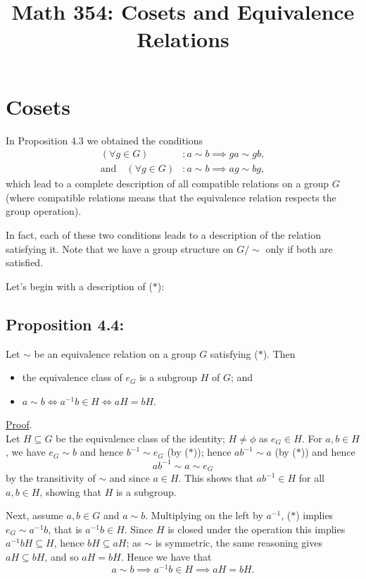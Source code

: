

\title{Math 354: Cosets and Equivalence Relations}

\section*{Cosets}

In Proposition 4.3 we obtained the conditions
\begin{align*}
(\forall g \in G) &: a \sim b \implies ga \sim gb, \tag{$*$} \\
\text{and} \quad (\forall g \in G) &: a \sim b \implies ag \sim bg,
\end{align*}
which lead to a complete description of all compatible relations on a group $G$ (where compatible relations means that the equivalence relation respects the group operation).

In fact, each of these two conditions leads to a description of the relation satisfying it. Note that we have a group structure on $G/{\sim}$ only if both are satisfied.

Let's begin with a description of ($*$):

\subsection*{Proposition 4.4:}
Let $\sim$ be an equivalence relation on a group $G$ satisfying ($*$). Then
\begin{itemize}
    \item the equivalence class of $e_G$ is a subgroup $H$ of $G$; and
    \item $a \sim b \iff a^{-1}b \in H \iff aH = bH$.
\end{itemize}

\noindent\underline{Proof}. \\
Let $H \subseteq G$ be the equivalence class of the identity; $H \neq \phi$ as $e_G \in H$. For $a, b \in H$, we have $e_G \sim b$ and hence $b^{-1} \sim e_G$ (by ($*$)); hence $ab^{-1} \sim a$ (by ($*$)) and hence
$$ab^{-1} \sim a \sim e_G$$
by the transitivity of $\sim$ and since $a \in H$. This shows that $ab^{-1} \in H$ for all $a, b \in H$, showing that $H$ is a subgroup.

Next, assume $a, b \in G$ and $a \sim b$. Multiplying on the left by $a^{-1}$, ($*$) implies $e_G \sim a^{-1}b$, that is $a^{-1}b \in H$. Since $H$ is closed under the operation this implies $a^{-1}bH \subseteq H$, hence $bH \subseteq aH$; as $\sim$ is symmetric, the same reasoning gives $aH \subseteq bH$, and so $aH = bH$. Hence we have that
$$a \sim b \implies a^{-1}b \in H \implies aH = bH.$$

